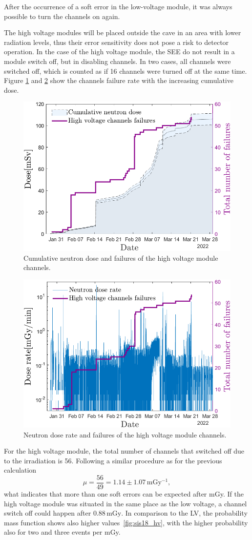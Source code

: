 After the occurrence of a soft error in the low-voltage module, it was always possible to turn the channels on again.

The high voltage modules will be placed outside the cave in an area with lower radiation levels, thus their error sensitivity does not pose a risk to detector operation. In the case of the high voltage module, the \gls{SEE} do not result in a module switch off, but in disabling channels. In two cases, all channels were switched off, which is counted as if 16 channels were turned off at the same time. Figure \ref{fig:hv_neutrons} and \ref{fig:hv_neutrons_rate} show the channels failure rate with the increasing cumulative dose. 
\begin{figure}[!h]
    \centering
    \includegraphics[width=0.6\columnwidth]{Chapter4/images/HV_failure_and_neutronrate.png}
    \caption{Cumulative neutron dose and failures of the high voltage module channels.}
    \label{fig:hv_neutrons}
\end{figure}
\begin{figure}[!h]
    \centering
    \includegraphics[width=0.6\columnwidth]{Chapter4/images/Hv_neutrons_dose_rate.png}
    \caption{Neutron dose rate and failures of the high voltage module channels.}
    \label{fig:hv_neutrons_rate}
\end{figure}
For the high voltage module, the total number of channels that switched off due to the irradiation is 56. Following a similar procedure as for the previous calculation
  \begin{equation}
 \mu = \frac{56}{49} = 1.14\pm 1.07\,\mathrm{mGy^{-1}},
\end{equation}
what indicates that more than one soft errors can be expected after mGy. 
If the high voltage module was situated in the same place as the low voltage, a channel switch off could happen after $0.88\mathrm{\,mGy}$. In comparison to the LV, the probability mass function shows also higher values~\ref{fig:sis18_hv}, with the higher probability also for two and three events per mGy.

